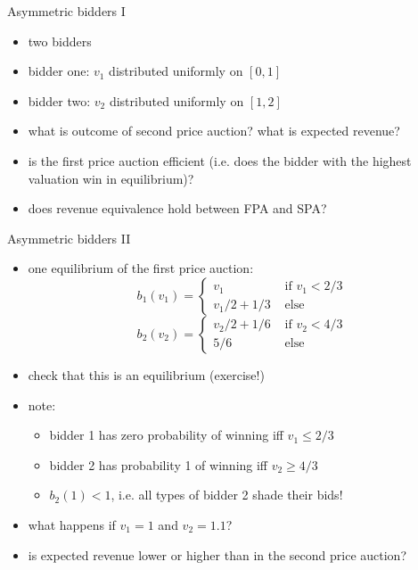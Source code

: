 \documentclass[bigger]{beamer}
\begin{document}
\begin{frame}[label={sec:org15e1085}]{Asymmetric bidders I}
\begin{itemize}
\item two bidders
\item bidder one: \(v_1\) distributed uniformly on \([0,1]\)
\item bidder two: \(v_2\) distributed uniformly on \([1,2]\)
\item what is outcome of second price auction? what is expected revenue?
\end{itemize}
\vspace*{0.3cm}
\begin{itemize}
\item is the first price auction efficient (i.e. does the bidder with the highest valuation win in equilibrium)?
\item does revenue equivalence hold between FPA and SPA?
\end{itemize}
\end{frame}
\begin{frame}[label={sec:org52f862a}]{Asymmetric bidders II}
\begin{itemize}
\item one equilibrium of the first price auction:
$$b_1(v_1)=\begin{cases}v_1 & \text{ if }v_1<2/3\\v_1/2+1/3& \text{ else }\end{cases}$$
$$b_2(v_2)=\begin{cases}v_2/2+1/6 & \text{ if }v_2<4/3\\ 5/6& \text{ else }\end{cases}$$
\item check that this is an equilibrium (exercise!)
\item note:
\begin{itemize}
\item bidder 1 has zero probability of winning iff \(v_1\leq 2/3\)
\item bidder 2 has probability 1 of winning iff \(v_2\geq 4/3\)
\item \(b_2(1)<1\), i.e. all types of bidder 2 shade their bids!
\end{itemize}
\item what happens if \(v_1=1\) and \(v_2=1.1\)?
\item is expected revenue lower or higher than in the second price auction?
\end{itemize}
\end{frame}
\end{document}
